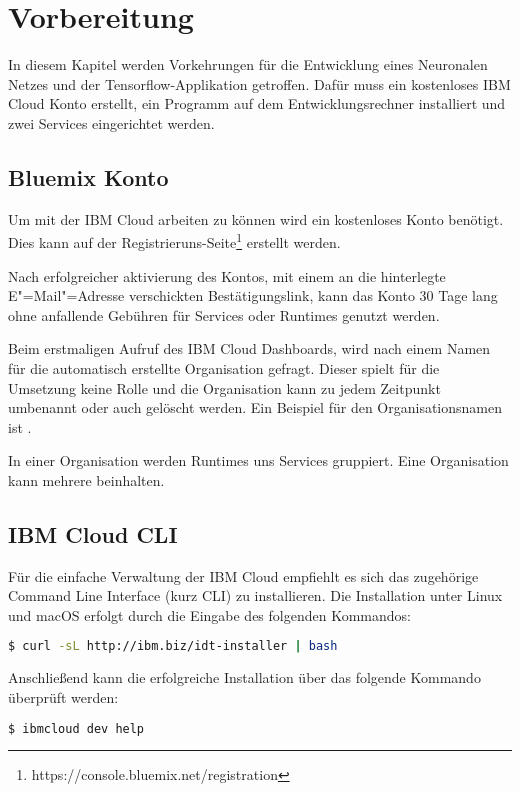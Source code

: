 \section{Vorbereitung}
In diesem Kapitel werden Vorkehrungen für die Entwicklung eines Neuronalen Netzes und der Tensorflow-Applikation
getroffen. Dafür muss ein kostenloses IBM Cloud Konto erstellt, ein Programm auf dem Entwicklungsrechner installiert und
zwei Services eingerichtet werden.

\subsection{Bluemix Konto}
Um mit der IBM Cloud arbeiten zu können wird ein kostenloses Konto benötigt. Dies kann auf der
Registrieruns-Seite\footnote{https://console.bluemix.net/registration} erstellt werden.

Nach erfolgreicher aktivierung des Kontos, mit einem an die hinterlegte E"=Mail"=Adresse verschickten Bestätigungslink,
kann das Konto 30 Tage lang ohne anfallende Gebühren für Services oder Runtimes genutzt werden.

Beim erstmaligen Aufruf des IBM Cloud Dashboards, wird nach einem Namen für die automatisch erstellte Organisation gefragt.
Dieser spielt für die Umsetzung keine Rolle und die Organisation kann zu jedem Zeitpunkt umbenannt oder auch gelöscht werden.
Ein Beispiel für den Organisationsnamen ist .

In einer Organisation werden Runtimes uns Services gruppiert. Eine Organisation kann mehrere  beinhalten.

\subsection{IBM Cloud CLI}
Für die einfache Verwaltung der IBM Cloud empfiehlt es sich das zugehörige Command Line Interface (kurz CLI) zu installieren.
Die Installation unter Linux und macOS erfolgt durch die Eingabe des folgenden Kommandos:

\begin{lstlisting}[language=bash, caption=Installation des IBM Cloud CLI, label=Installation des IBM Cloud CLI]
    $ curl -sL http://ibm.biz/idt-installer | bash
\end{lstlisting}

Anschließend kann die erfolgreiche Installation über das folgende Kommando überprüft werden:

\begin{lstlisting}[language=bash, caption=Installation des CLI überprüfen, label=Installation des CLI überprüfen]
    $ ibmcloud dev help
\end{lstlisting}

